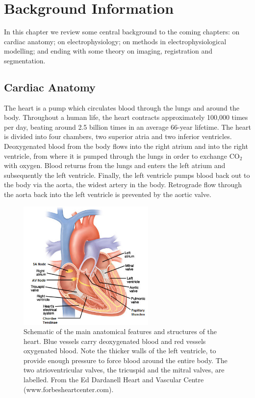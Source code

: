 \chapter{Background Information}
\dblspace

In this chapter we review some central background to the coming chapters: on cardiac anatomy; on electrophysiology; on methods in electrophysiological modelling; and ending with some theory on imaging, registration and segmentation.

\section{Cardiac Anatomy}
  The heart is a pump which circulates blood through the lungs and around the body. Throughout a human life, the heart contracts approximately 100,000 times per day, beating around 2.5 billion times in an average 66-year lifetime. The heart is divided into four chambers, two superior atria and two inferior ventricles. Deoxygenated blood from the body flows into the right atrium and into the right ventricle, from where it is pumped through the lungs in order to exchange CO$_2$ with oxygen. Blood returns from the lungs and enters the left atrium and subsequently the left ventricle. Finally, the left ventricle pumps blood back out to the body via the aorta, the widest artery in the body. Retrograde flow through the aorta back into the left ventricle is prevented by the aortic valve.
  
  \begin{figure}[htbp]
    \centering
    \includegraphics[width=0.6\textwidth]{Ch2/Figs/interior_heart_anatomy}
    \caption{Schematic of the main anatomical features and structures of the heart. Blue vessels carry deoxygenated blood and red vessels oxygenated blood. Note the thicker walls of the left ventricle, to provide enough pressure to force blood around the entire body. The two atrioventricular valves, the tricuspid and the mitral valves, are labelled. From the Ed Dardanell Heart and Vascular Centre (www.forbesheartcenter.com).}
    \label{fig:heart}
  \end{figure}  

